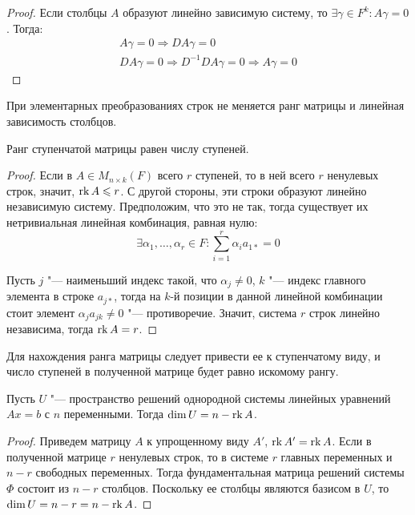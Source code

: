 \begin{proof}
	Если столбцы $A$ образуют линейно зависимую систему, то $\exists \gamma \in F^k: A\gamma = 0$. Тогда:
	\begin{gather*}
		A\gamma = 0 \Rightarrow DA\gamma = 0\\
		DA\gamma = 0 \Rightarrow D^{-1}DA\gamma = 0 \Rightarrow A\gamma = 0
	\end{gather*}
\end{proof}

\begin{corollary}
	При элементарных преобразованиях строк не меняется ранг матрицы и линейная зависимость столбцов.
\end{corollary}

\begin{proposition}
	Ранг ступенчатой матрицы равен числу ступеней.
\end{proposition}

\begin{proof}
	Если в $A \in M_{n \times k}(F)$ всего $r$ ступеней, то в ней всего $r$ ненулевых строк, значит, $\operatorname{rk}{A} \leqslant r$. С другой стороны, эти строки образуют линейно независимую систему. Предположим, что это не так, тогда существует их нетривиальная линейная комбинация, равная нулю:
	\[\exists \alpha_1, \dots, \alpha_r \in F: \sum_{i = 1}^{r}\alpha_ia_{1*} = 0\]
	
	Пусть $j$ "--- наименьший индекс такой, что $\alpha_j \ne 0$, $k$ "--- индекс главного элемента в строке $a_{j*}$, тогда на $k$-й позиции в данной линейной комбинации стоит элемент $\alpha_j a_{jk} \ne 0$ "--- противоречие. Значит, система $r$ строк линейно независима, тогда $\operatorname{rk}{A} = r$.
\end{proof}

\begin{corollary}
	Для нахождения ранга матрицы следует привести ее к ступенчатому виду, и число ступеней в полученной матрице будет равно искомому рангу.
\end{corollary}

\begin{theorem}
	Пусть $U$ "--- пространство решений однородной системы линейных уравнений $Ax = b$ с $n$ переменными. Тогда $\dim{U} \hm{=} n - \rk{A}$.
\end{theorem}

\begin{proof}
	Приведем матрицу $A$ к упрощенному виду $A'$, $\operatorname{rk}{A'} = \operatorname{rk}{A}$. Если в полученной матрице $r$ ненулевых строк, то в системе $r$ главных переменных и $n - r$ свободных переменных. Тогда фундаментальная матрица решений системы $\Phi$ состоит из $n - r$ столбцов. Поскольку ее столбцы являются базисом в $U$, то $\dim{U} = n - r = n - \operatorname{rk}{A}$.
\end{proof}

